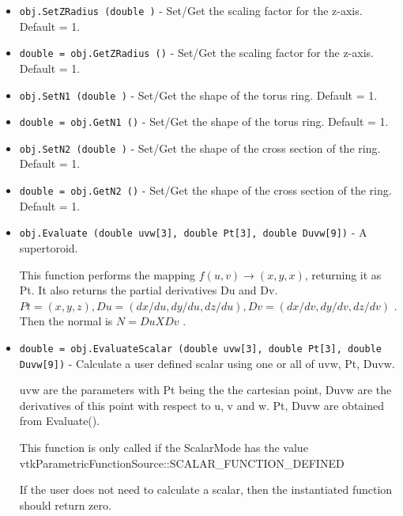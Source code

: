 \begin{itemize}
\item  \verb|obj.SetZRadius (double )| -  Set/Get the scaling factor for the z-axis. Default = 1.

\item  \verb|double = obj.GetZRadius ()| -  Set/Get the scaling factor for the z-axis. Default = 1.

\item  \verb|obj.SetN1 (double )| -  Set/Get the shape of the torus ring.  Default = 1.

\item  \verb|double = obj.GetN1 ()| -  Set/Get the shape of the torus ring.  Default = 1.

\item  \verb|obj.SetN2 (double )| -   Set/Get the shape of the cross section of the ring. Default = 1.

\item  \verb|double = obj.GetN2 ()| -   Set/Get the shape of the cross section of the ring. Default = 1.

\item  \verb|obj.Evaluate (double uvw[3], double Pt[3], double Duvw[9])| -  A supertoroid.

 This function performs the mapping $f(u,v) \rightarrow (x,y,x)$, returning it
 as Pt. It also returns the partial derivatives Du and Dv.
 $Pt = (x, y, z), Du = (dx/du, dy/du, dz/du), Dv = (dx/dv, dy/dv, dz/dv)$ .
 Then the normal is $N = Du X Dv$ .

\item  \verb|double = obj.EvaluateScalar (double uvw[3], double Pt[3], double Duvw[9])| -  Calculate a user defined scalar using one or all of uvw, Pt, Duvw.

 uvw are the parameters with Pt being the the cartesian point, 
 Duvw are the derivatives of this point with respect to u, v and w.
 Pt, Duvw are obtained from Evaluate().

 This function is only called if the ScalarMode has the value
 vtkParametricFunctionSource::SCALAR\_FUNCTION\_DEFINED

 If the user does not need to calculate a scalar, then the 
 instantiated function should return zero. 


\end{itemize}
